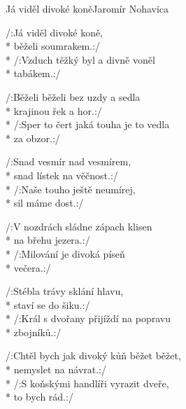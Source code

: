 \documentclass[10.5pt]{book}
\begin{document}
\begin{poem}{Já viděl divoké koně}{Jaromír Nohavica}

\settowidth{\versewidth}{Běželi běželi bez uzdy a sedla}

/:Já viděl divoké koně, \\*
běželi soumrakem.:/\\*
/:Vzduch těžký byl a divně voněl\\*
tabákem.:/

/:Běželi běželi bez uzdy a sedla\\*
krajinou řek a hor.:/\\*
/:Sper to čert jaká touha je to vedla\\*
za obzor.:/

/:Snad vesmír nad vesmírem, \\*
snad lístek na věčnost.:/\\*
/:Naše touho ještě neumírej, \\*
sil máme dost.:/

/:V nozdrách sládne zápach klisen \\*
na břehu jezera.:/\\*
/:Milování je divoká píseň \\*
večera.:/

/:Stébla trávy sklání hlavu, \\*
staví se do šiku.:/\\*
/:Král s dvořany přijíždí na popravu \\*
zbojníků.:/

/:Chtěl bych jak divoký kůň běžet běžet,\\* 
nemyslet na návrat.:/\\*
/:S koňskými handlíři vyrazit dveře, \\*
to bych rád.:/

\end{poem}
\end{document}
